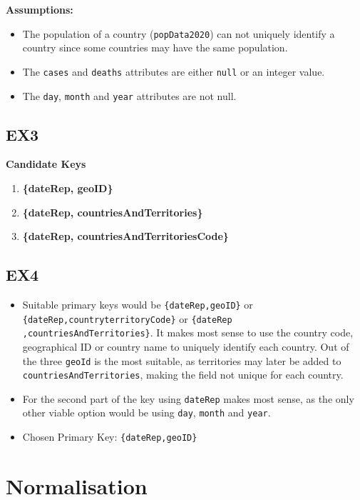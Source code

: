\documentclass[12pt,oneside,a4paper,english]{article}
\begin{document}
\textbf{Assumptions: }
\begin{itemize}
    \item The population of a country (\texttt{popData2020}) can not uniquely identify a country since some countries may have the same population.
    \item The \texttt{cases} and \texttt{deaths} attributes are either \texttt{null} or an integer value.
    \item The \texttt{day}, \texttt{month} and \texttt{year} attributes are not null.
    
\end{itemize}

\subsection{EX3}
\textbf{\large{Candidate Keys}}
\begin{enumerate}
    \item \textbf{\{dateRep, geoID\}}
    \item \textbf{\{dateRep, countriesAndTerritories\}}
    \item \textbf{\{dateRep, countriesAndTerritoriesCode\}}
    
\end{enumerate}
\subsection{EX4}
\begin{itemize}
\item Suitable primary keys would be \texttt{\{dateRep,geoID\}} or \texttt{\{dateRep,countryterritoryCode\}} or
\texttt{\{dateRep} \texttt{,countriesAndTerritories\}}. It makes most sense to use the country code, geographical ID or country name to uniquely identify each country. 
Out of the three \texttt{geoId} is the most suitable, as territories may later be added to \texttt{countriesAndTerritories}, making the field not unique for each country.
\item For the second part of the key using \texttt{dateRep} makes most sense, as the only other viable option would be using \texttt{day}, \texttt{month} and \texttt{year}.
\item Chosen Primary Key: \texttt{\{dateRep,geoID\}}
\end{itemize}

\section{Normalisation}
\end{document}
